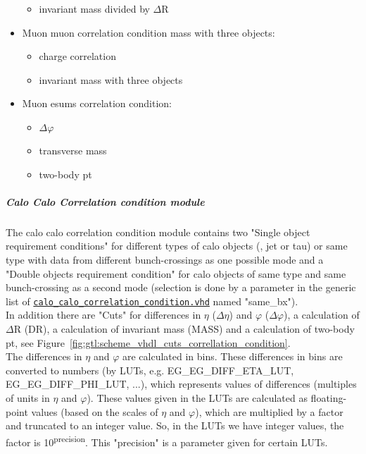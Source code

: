 \begin{itemize}
\begin{itemize}
\item invariant mass divided by $\Delta$R
\end{itemize}
\item Muon muon correlation condition mass with three objects:
\begin{itemize}
\item charge correlation
\item invariant mass with three objects
\end{itemize} 
\item Muon esums correlation condition:
\begin{itemize}
\item $\Delta\varphi$
\item transverse mass
\item two-body pt
\end{itemize}
\end{itemize}

\subparagraph{Calo Calo Correlation condition module}
\label{sec:gtl:calo_calo_correlation_condition_module}

The calo calo correlation condition module contains two "Single object requirement conditions" for different types of calo objects (\egamma, jet or tau) or same type with data from different bunch-crossings as one possible mode and a "Double objects requirement condition" for calo objects of same type and same bunch-crossing as a second mode (selection is done by a parameter in the generic list of \href{https://github.com/cms-l1-globaltrigger/mp7_ugt_legacy/tree/master/firmware/hdl/gt_mp7_core/gtl_fdl_wrapper/gtl/calo_calo_correlation_condition.vhd}{\texttt{calo\_calo\_correlation\_condition.vhd}} named "same\_bx").\\
In addition there are "Cuts" for differences in $\eta$ ($\Delta\eta$) and $\varphi$ ($\Delta\varphi$), a calculation of $\Delta$R (DR), a calculation of invariant mass (MASS) and a calculation of two-body pt, see Figure~\ref{fig:gtl:scheme_vhdl_cuts_correllation_condition}.\\
The differences in $\eta$ and $\varphi$ are calculated in bins. These differences in bins are converted to numbers (by LUTs, e.g. \small{EG\_EG\_DIFF\_ETA\_LUT, EG\_EG\_DIFF\_PHI\_LUT}\normalsize, ...), which represents values of differences (multiples of units in $\eta$ and $\varphi$).
These values given in the LUTs are calculated as floating-point values (based on the scales of $\eta$ and $\varphi$), which are multiplied by a factor and truncated to an integer value.
So, in the LUTs we have integer values, the factor is 10\textsuperscript{\tiny{precision}\normalsize}. This "precision" is a parameter given for certain LUTs.\\

